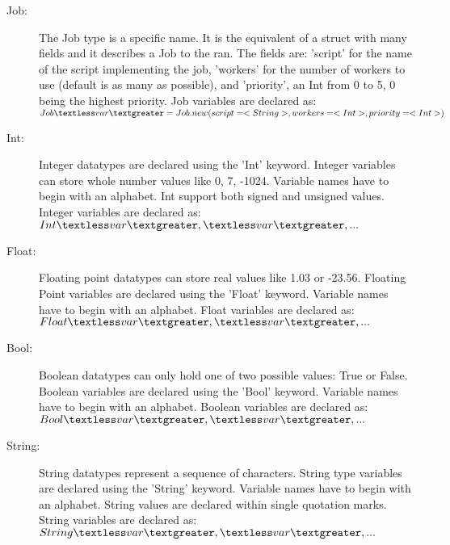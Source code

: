 \begin{description}
\item [Job:] The Job type is a \lang specific name. It is the equivalent of a struct
with many fields and it describes a Job to the ran. The fields are: 'script' for the
name of the script implementing the job, 'workers' for the number of workers to use
(default is as many as possible), and 'priority', an Int from 0 to 5, 0 being the
highest priority.
Job variables are declared as:
$Job \textless var\textgreater = Job.new(script=<String>, workers=<Int>, priority=<Int>)$

\item [Int:] Integer datatypes are declared using the 'Int' keyword. Integer 
variables can store whole number values like 0, 7, -1024. Variable names have 
to begin with an alphabet. Int support both signed and unsigned values.
Integer variables are declared as:
$Int \textless var\textgreater, \textless var\textgreater, ...$ 


\item [Float:] Floating point datatypes can store real values like 1.03 or -23.56. 
Floating Point variables are declared using the 'Float' keyword. Variable names 
have to begin with an alphabet. Float variables are declared as:
$Float \textless  var\textgreater, \textless  var\textgreater, ...$



\item [Bool:] Boolean datatypes can only hold one of two possible values: 
True or False. Boolean variables are declared using the 'Bool' keyword. Variable 
names have to begin with an alphabet. Boolean variables are declared as:
$Bool \textless  var\textgreater, \textless  var\textgreater, ...$
%



\item [String:] String datatypes represent a sequence of characters. String type 
variables are declared using the 'String' keyword. Variable names have to begin
with an alphabet. String values are declared within single quotation marks.
String variables are declared as:
$String \textless var\textgreater, \textless  var\textgreater, ...$


\end{description}
